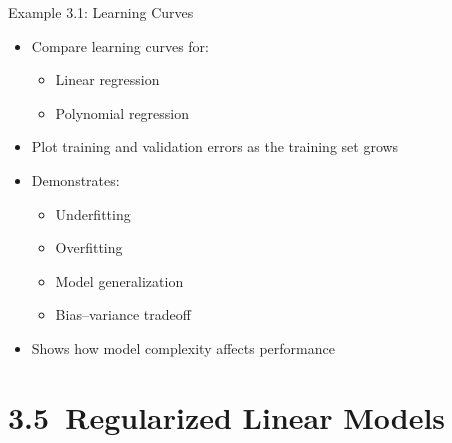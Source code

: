 \documentclass[aspectratio=169]{beamer}
\begin{document}
\begin{frame}{Example 3.1: Learning Curves}
	
	\begin{itemize}
		\item Compare learning curves for:
		\begin{itemize}
			\item Linear regression
			\item Polynomial regression
		\end{itemize}
		
		\vspace{0.5em}
		
		\item Plot training and validation errors as the training set grows
		
		\vspace{0.5em}
		
		\item Demonstrates:
		\begin{itemize}
			\item Underfitting
			\item Overfitting
			\item Model generalization
			\item Bias--variance tradeoff
		\end{itemize}
		
		\vspace{0.5em}
		
		\item Shows how model complexity affects performance
	\end{itemize}
	
\end{frame}

\section{3.5~Regularized Linear Models}
\end{document}
